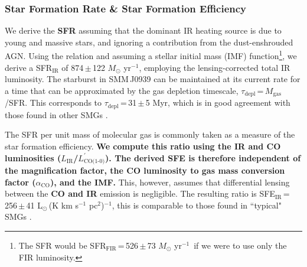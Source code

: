 \documentclass[iop]{emulateapj}
\newcommand{\Msun}{\mbox{$M_{\odot}$}}
\newcommand{\Lsun}{\mbox{L$_{\odot}$}}
\newcommand{\Lp}{\mbox{$L^{\prime}_\textrm{CO(1-0)}$}}
\newcommand{\LpU}{\mbox{K\,\,km\,\,s$^{-1}$\,\,pc$^2$}}
\newcommand{\eg}{{\sl e.g.,~}}
\newcommand{\pmOne}{\mbox{$^{-1}$}}
\begin{document}
\subsubsection{{\bf Star Formation Rate \& Star Formation Efficiency}}
We derive the {\bf SFR} assuming that the dominant IR heating source is due to young and massive stars, and ignoring a contribution from the
dust-enshrouded AGN.
Using the \citet{Kennicutt98a} relation and assuming a \citet{Chabrier03a}
stellar initial mass (IMF) function\footnote{The SFR would be SFR$_\textrm{FIR}$\,=\,526\,$\pm$\,73 $M_
\odot$ yr\pmOne\ if we were to use only the FIR luminosity.},
we derive a SFR$_\textrm{IR}$ of 874\,$\pm$\,122 $\Msun$\,\,yr\pmOne, employing the lensing-corrected total IR luminosity.
The starburst in SMM\,J0939 can be maintained at its
current rate for a time that can be approximated by the gas depletion timescale, $\tau_\textrm{depl}$\,=\,$M_\textrm{gas}$/SFR.
This corresponds to $\tau_\textrm{depl}$\,=\,31\,$\pm$\,5 Myr, which is in good agreement with those found in other SMGs \citep[\eg][]{Greve05a}.

The SFR per unit mass of molecular gas is commonly taken as a
measure of the star formation efficiency. 
{\bf We compute this ratio using the IR
and CO luminosities ($L_\textrm{IR}$/\Lp). The derived SFE is therefore independent of the magnification factor, the CO luminosity to gas mass conversion factor ($\alpha_\textrm{CO}$), and the
IMF. }This, however, assumes that differential lensing between the {\bf CO and IR} emission is negligible.
The resulting ratio is SFE$_\textrm{IR}$\,=\,256\,$\pm$\,41\,\,\Lsun\,(\LpU)$^{-1}$, this is comparable
to those found in ``typical" SMGs \citep{Greve05a,Tacconi06a,Riechers11c}.
\end{document}
